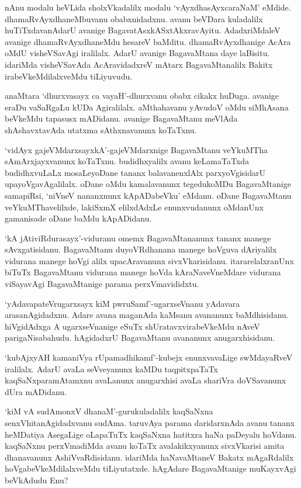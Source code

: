 nAnu modalu heVLida sholxVkadalilx modalu `vAyxdhasAyxcaraNaM' eMdide. dhamaRvAyxdhaneMbuvanu obabxnidadxnu. avanu beVDara kuladalilx huTiTxdavanAdarU avanige BagavatAsxkASxtAkxravAyitu. AdadxriMdaleV avanige dhamaRvAyxdhaneMdu hesareV baMditu. dhamaRvAyxdhanige AcAra oMdU visheVSavAgi iralilalx. AdarU avanige BagavaMtana daye laBisitu. idariMda visheVSavAda AcAravidadxreV mAtarx BagavaMtanalilx Bakitx irabeVkeMdilalxveMdu tiLiyuvudu.

anaMtara `dhurxvasayx ca vayaH'-dhurxvanu obabx cikakx huDuga. avanige eraDu vaSaRgaLu kUDa Agiralilalx. aMthahavanu yAvudoV oMdu siMhAsana beVkeMdu tapasusx mADidanu. avanige BagavaMtanu meVlAda shAshavxtavAda utatxma sAthxnavanunx koTaTxnu.

`vidAyx gajeVMdarxsayxkA'-gajeVMdarxnige BagavaMtanu veYkuMTha sAmArxjayxvanunx koTaTxnu. budidhxyalilx avanu keLamaTaTxda budidhxvuLaLx mosaLeyoDane tananx balavanenxlAlx parxyoVgisidarU upayoVgavAgalilalx. oDane oMdu kamalavanunx tegedukoMDu BagavaMtanige samapiRsi, `niVneV nananxnunx kApADabeVku' eMdanu. oDane BagavaMtanu veYkuMThavelilxde, lakiSxmX elilxdAdxLe enunxvudanunx oMdanUnx gamanisade oDane baMdu kApADidanu.

`kA jAtiviRdurasayx'-viduranu omemx BagavaMtananunx tananx manege sAvxgatisidanu. BagavaMtanu duyoVRdhanana manege hoVguva dAriyalilx vidurana manege hoVgi alilx upacAravanunx sivxVkarisidanu. itararelalxranUnx biTuTx BagavaMtanu vidurana manege hoVda kAraNaveVneMdare vidurana viSayavAgi BagavaMtanige parama perxVmavididxtu.

`yAdavapateVrugarxsayx kiM pwruSamf'-ugarxseVnanu yAdavara arasanAgidadxnu. Adare avana maganAda kaMsanu avananunx baMdhisidanu. hiVgidAdxga A ugarxseVnanige eSuTx shUratavxvirabeVkeMdu nAveV parigaNisabahudu. hAgidadxrU BagavaMtanu avananunx anugarxhisidanu.

`kubAjxyAH kamaniVya rUpamadhikamf'-kubejx enunxvavaLige swMdayaRveV iralilalx. AdarU avaLa seVveyanunx kaMDu taqpitxpaTaTx kaqSaNxparamAtamxnu avaLanunx anugarxhisi avaLa shariVra doVSavanunx dUra mADidanu.

`kiM vA sudAmonxV dhanaM'-gurukuladalilx kaqSaNxna senxVhitanAgidadxvanu sudAma. taruvAya parama daridarxnAda avanu tananx heMDatiya AsegaLige oLapaTuTx kaqSaNxna hatitxra haNa paDeyalu hoVdanu. kaqSaNxnu perxVmadiMda avanu koTaTx avalakikxyanunx sivxVkarisi amita dhanavanunx AshiVvaRdisidanu. idariMda haNavaMtaneV Bakatx mAgaRdalilx hoVgabeVkeMdilalxveMdu tiLiyutatxde. hAgAdare BagavaMtanige muKayxvAgi beVkAdudu Enu?

